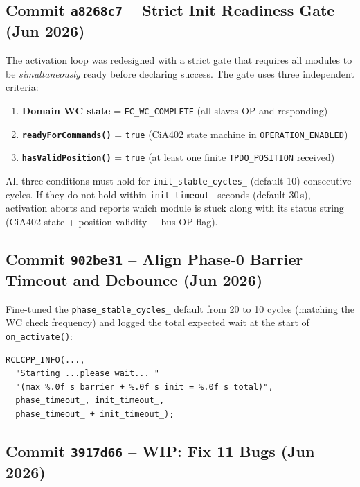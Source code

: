 \documentclass[11pt,a4paper]{article}
\begin{document}
\subsection{Commit \texttt{a8268c7} -- Strict Init Readiness Gate (Jun 2026)}

The activation loop was redesigned with a strict gate that requires all
modules to be \emph{simultaneously} ready before declaring success.  The gate
uses three independent criteria:

\begin{enumerate}[nosep]
  \item \textbf{Domain WC state} = \texttt{EC\_WC\_COMPLETE} (all slaves OP
        and responding)
  \item \textbf{\texttt{readyForCommands()}} = \texttt{true}
        (CiA402 state machine in \texttt{OPERATION\_ENABLED})
  \item \textbf{\texttt{hasValidPosition()}} = \texttt{true}
        (at least one finite \texttt{TPDO\_POSITION} received)
\end{enumerate}

All three conditions must hold for \texttt{init\_stable\_cycles\_} (default
10) consecutive cycles.  If they do not hold within \texttt{init\_timeout\_}
seconds (default 30\,s), activation aborts and reports which module is stuck
along with its status string (CiA402 state + position validity + bus-OP flag).

\subsection{Commit \texttt{902be31} -- Align Phase-0 Barrier Timeout and Debounce (Jun 2026)}

Fine-tuned the \texttt{phase\_stable\_cycles\_} default from 20 to 10 cycles
(matching the WC check frequency) and logged the total expected wait at the
start of \texttt{on\_activate()}:

\begin{lstlisting}[caption={Total timeout log at activation start}]
RCLCPP_INFO(...,
  "Starting ...please wait... "
  "(max %.0f s barrier + %.0f s init = %.0f s total)",
  phase_timeout_, init_timeout_,
  phase_timeout_ + init_timeout_);
\end{lstlisting}

\subsection{Commit \texttt{3917d66} -- WIP: Fix 11 Bugs (Jun 2026)}
\label{sec:bugfixes}
\end{document}
